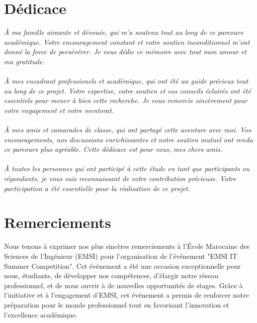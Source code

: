 \documentclass[a4paper, oneside, 12pt, final]{extreport}
\newcommand{\reportAuthor} {%
  Haitham \textsc{EL ABDIOUI}\\
  Aboubakr \textsc{KETOUN}%
}
\begin{document}
\chapter*{Dédicace}
\thispagestyle{empty}
\textit{À ma famille aimante et dévouée, qui m'a soutenu tout au long de ce parcours académique. Votre encouragement constant et votre soutien inconditionnel m'ont donné la force de persévérer. Je vous dédie ce mémoire avec tout mon amour et ma gratitude.
\\
\\
À mes encadrant professionels et académique, qui ont été un guide précieux tout au long de ce projet. Votre expertise, votre soutien et vos conseils éclairés ont été essentiels pour mener à bien cette recherche. Je vous remercie sincèrement pour votre engagement et votre mentorat.
\\
\\
À mes amis et camarades de classe, qui ont partagé cette aventure avec moi. Vos encouragements, nos discussions enrichissantes et notre soutien mutuel ont rendu ce parcours plus agréable. Cette dédicace est pour vous, mes chers amis.
\\
\\
À toutes les personnes qui ont participé à cette étude en tant que participants ou répondants, je vous suis reconnaissant de votre contribution précieuse. Votre participation a été essentielle pour la réalisation de ce projet.
}

%
%

\chapter*{Remerciements}
\thispagestyle{empty}
%
Nous tenons à exprimer nos plus sincères remerciements à l'École Marocaine des Sciences de l'Ingénieur (EMSI) pour l'organisation de l'événement "EMSI IT Summer Competition". Cet événement a été une occasion exceptionnelle pour nous, étudiants, de développer nos compétences, d'élargir notre réseau professionnel, et de nous ouvrir à de nouvelles opportunités de stages. Grâce à l'initiative et à l'engagement d'EMSI, cet événement a permis de renforcer notre préparation pour le monde professionnel tout en favorisant l'innovation et l'excellence académique.
\end{document}
